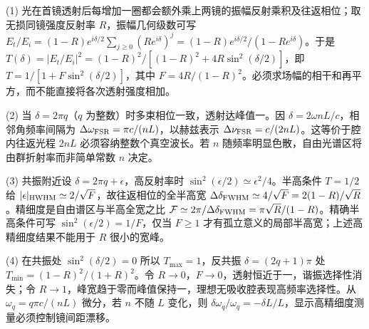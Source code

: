 (1) 光在首镜透射后每增加一圈都会额外乘上两镜的振幅反射乘积及往返相位；取无损同镜强度反射率 \(R\)，振幅几何级数可写 \(E_t/E_i=(1-R)e^{i\delta/2}\sum_{j\ge0}(Re^{i\delta})^j=(1-R)e^{i\delta/2}/(1-Re^{i\delta})\)。于是 \(T(\delta)=|E_t/E_i|^2=(1-R)^2/[(1-R)^2+4R\sin^2(\delta/2)]\)，即 \(T=1/[1+F\sin^2(\delta/2)]\)，其中 \(F=4R/(1-R)^2\)。必须求场幅的相干和再平方，而不能直接将各次透射强度相加。

(2) 当 \(\delta=2\pi q\)（\(q\) 为整数）时多束相位一致，透射达峰值一。因 \(\delta=2\omega nL/c\)，相邻角频率间隔为 \(\Delta\omega_{\rm FSR}=\pi c/(nL)\)，以赫兹表示 \(\Delta\nu_{\rm FSR}=c/(2nL)\)。这等价于腔内往返光程 \(2nL\) 必须容纳整数个真空波长。若 \(n\) 随频率明显色散，自由光谱区将由群折射率而非简单常数 \(n\) 决定。

(3) 共振附近设 \(\delta=2\pi q+\epsilon\)，高反射率时 \(\sin^2(\epsilon/2)\simeq\epsilon^2/4\)。半高条件 \(T=1/2\) 给 \(|\epsilon|_{\rm HWHM}\simeq2/\sqrt F\)，故往返相位的全半高宽 \(\Delta\delta_{\rm FWHM}\simeq4/\sqrt F=2(1-R)/\sqrt R\)。精细度是自由谱区与半高全宽之比 \(\mathcal F\simeq2\pi/\Delta\delta_{\rm FWHM}=\pi\sqrt R/(1-R)\)。精确半高条件可写 \(\sin^2(\epsilon/2)=1/F\)，仅当 \(F\ge1\) 才有孤立意义的局部半高宽；上述高精细度结果不能用于 \(R\) 很小的宽峰。

(4) 在共振处 \(\sin^2(\delta/2)=0\) 所以 \(T_{\max}=1\)，反共振 \(\delta=(2q+1)\pi\) 处 \(T_{\min}=(1-R)^2/(1+R)^2\)。令 \(R\to0\)，\(F\to0\)，透射恒近于一，谐振选择性消失；令 \(R\to1\)，峰宽趋于零而峰值保持一，理想无吸收腔表现高频率选择性。从 \(\omega_q=q\pi c/(nL)\) 微分，若 \(n\) 不随 \(L\) 变化，则 \(\delta\omega_q/\omega_q=-\delta L/L\)，显示高精细度测量必须控制镜间距漂移。
